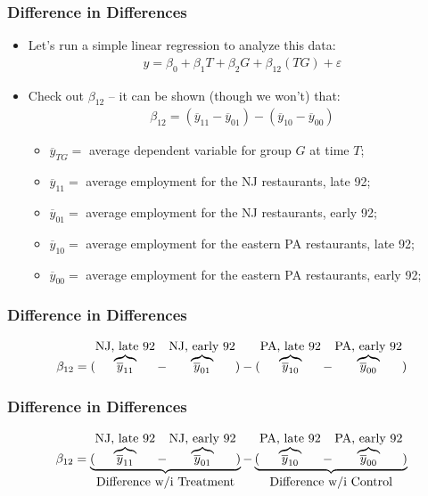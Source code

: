 \documentclass[aspectratio=169]{beamer}
\theoremstyle{principle}
\begin{document}
\begin{frame}
\frametitle{Difference in Differences}

\begin{itemize}
\item Let's run a simple linear regression to analyze this data:\huge
\begin{align*}
y = \beta_0 + \beta_1T + \beta_2G + \beta_{12}(TG) + \varepsilon
\end{align*}

\normalsize
\item Check out $\beta_{12}$ -- it can be shown (though we won't) that:
\begin{align*}
\beta_{12} = (\overline{y}_{11} - \overline{y}_{01}) - (\overline{y}_{10} - \overline{y}_{00})
\end{align*}
\begin{itemize}
\item $\overline{y}_{TG} = $ average dependent variable for group $G$ at time $T$;
\item $\overline{y}_{11} = $ average employment for the NJ restaurants, late 92;
\item $\overline{y}_{01} = $ average employment for the NJ restaurants, early 92;
\item $\overline{y}_{10} = $ average employment for the eastern PA restaurants, late 92;
\item $\overline{y}_{00} = $ average employment for the eastern PA restaurants, early 92;
\end{itemize}
\end{itemize}

\end{frame}

\begin{frame}
\frametitle{Difference in Differences}

\huge
\begin{align*}
\beta_{12} = (\overbrace{\overline{y}_{11}}^{\mbox{\normalsize NJ, late 92}} - \overbrace{\overline{y}_{01}}^{\mbox{\normalsize NJ, early 92}}) - (\overbrace{\overline{y}_{10}}^{\mbox{\normalsize PA, late 92}} - \overbrace{\overline{y}_{00}}^{\mbox{\normalsize PA, early 92}})
\end{align*}

\end{frame}

\begin{frame}
\frametitle{Difference in Differences}

\huge
\begin{align*}
\beta_{12} = \underbrace{(\overbrace{\overline{y}_{11}}^{\mbox{\normalsize NJ, late 92}} - \overbrace{\overline{y}_{01}}^{\mbox{\normalsize NJ, early 92}})}_{\mbox{\normalsize Difference w/i Treatment}} - \underbrace{(\overbrace{\overline{y}_{10}}^{\mbox{\normalsize PA, late 92}} - \overbrace{\overline{y}_{00}}^{\mbox{\normalsize PA, early 92}})}_{\mbox{\normalsize Difference w/i Control}}
\end{align*}

\end{frame}
\end{document}
